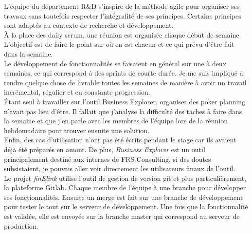 L'équipe du département R\&D s'inspire de la méthode agile pour organiser ses travaux sans toutefois respecter l'intégralité de ses principes. Certains principes sont adaptés au contexte de recherche et développement.\\

À la place des daily scrum, une réunion est organisée chaque début de semaine. L'objectif est de faire le point sur où en est chacun et ce qui prévu d'être fait dans la semaine.\\

Le développement de fonctionnalités se faisaient en général sur une à deux semaines, ce qui correspond à des sprints de courte durée. Je me suis impliqué à rendre quelque chose de livrable toutes les semaines de manière à avoir un travail incrémental, régulier et en constante progression.\\

Étant seul à travailler sur l'outil Business Explorer, organiser des poker planning n'avait pas lieu d'être. Il fallait que j'analyse la difficulté des tâches à faire dans la semaine et que j'en parle avec les membres de l'équipe lors de la réunion hebdomadaire pour trouver ensuite une solution.\\

Enfin, des cas d'utilisation n'ont pas été écrits pendant le stage car ils avaient déjà été préparés en amont. De plus, \textit{Business Explorer} est un outil principalement destiné aux internes de FRS Consulting, si des doutes subsistaient, je pouvais aller voir directement les utilisateurs finaux de l'outil.\\

Le projet \textit{finElink} utilise l'outil de gestion de version git et plus particulièrement, la plateforme Gitlab. Chaque membre de l'équipe à une branche pour développer ses fonctionnalités. Ensuite un merge est fait sur une branche de développement pour tester le tout sur le serveur de développement. Une fois que la fonctionnalité est validée, elle est envoyée sur la branche master qui correspond au serveur de production.\\